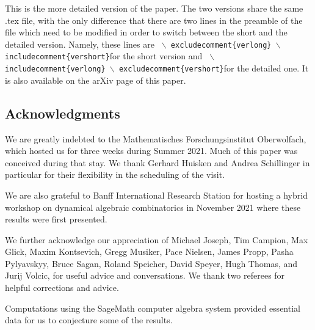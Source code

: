 \documentclass[numbers=enddot,12pt,final,onecolumn,notitlepage]{scrartcl}%
\theoremstyle{definition}
\newenvironment{verlong}{}{}
\begin{document}
\begin{verlong}
This is the more detailed version of the paper. The two versions share the
same .tex file, with the only difference that there are two lines in the
preamble of the file which need to be modified in order to switch between the
short and the detailed version. Namely, these lines are \newline\texttt{%
$\backslash$%
excludecomment\{verlong\}}\newline\texttt{%
$\backslash$%
includecomment\{vershort\}}\newline for the short version and \newline\texttt{%
$\backslash$%
includecomment\{verlong\}}\newline\texttt{%
$\backslash$%
excludecomment\{vershort\}}\newline for the detailed one. It is also available
on the arXiv page of this paper.
\end{verlong}

\subsection{Acknowledgments}

We are greatly indebted to the Mathematisches Forschungsinstitut Oberwolfach,
which hosted us for three weeks during Summer 2021. Much of this paper was
conceived during that stay. We thank Gerhard Huisken and Andrea Schillinger in
particular for their flexibility in the scheduling of the visit.

We are also grateful to Banff International Research Station for hosting a
hybrid workshop on dynamical algebraic combinatorics in November 2021 where
these results were first presented.

We further acknowledge our appreciation of Michael Joseph, Tim Campion, Max
Glick, Maxim Kontsevich, Gregg Musiker, Pace Nielsen, James Propp, Pasha
Pylyavskyy, Bruce Sagan, Roland Speicher, David Speyer, Hugh Thomas, and Jurij
Volcic, for useful advice and conversations. We thank two referees for helpful
corrections and advice.

Computations using the SageMath computer algebra system \cite{sage} provided
essential data for us to conjecture some of the results.
\end{document}
